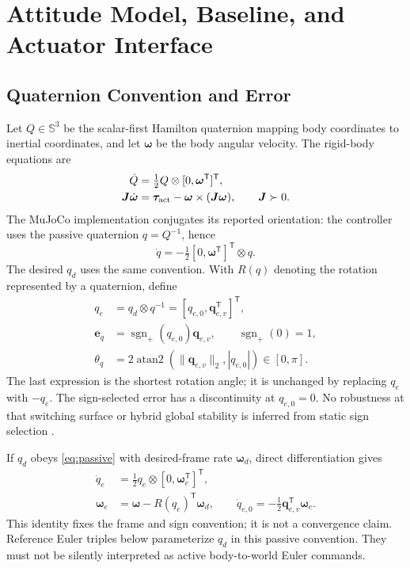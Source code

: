 \documentclass[letterpaper,10pt,conference]{IEEEtran}
\newcommand{\T}{^{\mathsf T}}
\newcommand{\sgnp}{\operatorname{sgn}_{+}}
\begin{document}
\section{Attitude Model, Baseline, and Actuator Interface}
\label{sec:problem}
\subsection{Quaternion Convention and Error}
Let $Q\in\mathbb S^3$ be the scalar-first Hamilton quaternion mapping body
coordinates to inertial coordinates, and let $\bm\omega$ be the body angular
velocity. The rigid-body equations are
\begin{align}
 \dot Q&=\tfrac12 Q\otimes[0,\bm\omega\T]\T,\\
 \bm J\dot{\bm\omega}&=\bm\tau_{\rm act}
       -\bm\omega\times(\bm J\bm\omega),\qquad \bm J\succ0.
 \label{eq:plant}
\end{align}
The MuJoCo implementation conjugates its reported orientation:
the controller uses the passive quaternion $q=Q^{-1}$, hence
\begin{equation}
 \dot q=-\tfrac12[0,\bm\omega\T]\T\otimes q.
 \label{eq:passive}
\end{equation}
The desired $q_d$ uses the same convention. With $R(q)$ denoting the
rotation represented by a quaternion, define
\begin{align}
 q_e&=q_d\otimes q^{-1}=[q_{e,0},\bm q_{e,v}\T]\T,\\
 \bm e_q&=\sgnp(q_{e,0})\bm q_{e,v},\qquad \sgnp(0)=1,\\
 \theta_q&=2\operatorname{atan2}(\|\bm q_{e,v}\|_2,|q_{e,0}|)
             \in[0,\pi].
 \label{eq:theta}
\end{align}
The last expression is the shortest rotation angle; it is unchanged by
replacing $q_e$ with $-q_e$. The sign-selected error has a discontinuity at
$q_{e,0}=0$. No robustness at that switching surface or hybrid global
stability is inferred from static sign selection \cite{mayhew2011hybrid}.

If $q_d$ obeys \eqref{eq:passive} with desired-frame rate
$\bm\omega_d$, direct differentiation gives
\begin{align}
 \dot q_e&=\tfrac12 q_e\otimes[0,\bm\omega_e\T]\T,\\
 \bm\omega_e&=\bm\omega-R(q_e)\T\bm\omega_d,\qquad
 \dot q_{e,0}=-\tfrac12\bm q_{e,v}\T\bm\omega_e.
 \label{eq:errkin}
\end{align}
This identity fixes the frame and sign convention; it is not a convergence
claim. Reference Euler triples below parameterize $q_d$ in this passive
convention. They must not be silently interpreted as active body-to-world
Euler commands.
\end{document}
